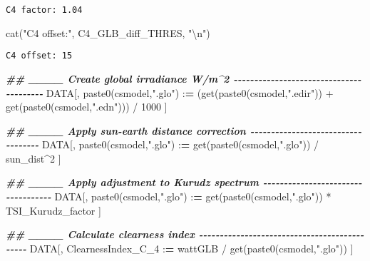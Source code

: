 \documentclass[
  10pt,
  a4paper,oneside]{article}
\newenvironment{Shaded}{\begin{snugshade}}{\end{snugshade}}
\newcommand{\DecValTok}[1]{\textcolor[rgb]{0.00,0.00,0.81}{#1}}
\newcommand{\DocumentationTok}[1]{\textcolor[rgb]{0.56,0.35,0.01}{\textbf{\textit{#1}}}}
\newcommand{\ErrorTok}[1]{\textcolor[rgb]{0.64,0.00,0.00}{\textbf{#1}}}
\newcommand{\FunctionTok}[1]{\textcolor[rgb]{0.00,0.00,0.00}{#1}}
\newcommand{\NormalTok}[1]{#1}
\newcommand{\SpecialCharTok}[1]{\textcolor[rgb]{0.00,0.00,0.00}{#1}}
\newcommand{\StringTok}[1]{\textcolor[rgb]{0.31,0.60,0.02}{#1}}
\begin{document}
\begin{verbatim}
C4 factor: 1.04 
\end{verbatim}

\begin{Shaded}
\begin{Highlighting}[]
\FunctionTok{cat}\NormalTok{(}\StringTok{"C4 offset:"}\NormalTok{, C4\_GLB\_diff\_THRES, }\StringTok{"}\SpecialCharTok{\textbackslash{}n}\StringTok{"}\NormalTok{)}
\end{Highlighting}
\end{Shaded}

\begin{verbatim}
C4 offset: 15 
\end{verbatim}

\begin{Shaded}
\begin{Highlighting}[]
\DocumentationTok{\#\# \_\_\_\_ Create global irradiance W/m\^{}2  {-}{-}{-}{-}{-}{-}{-}{-}{-}{-}{-}{-}{-}{-}{-}{-}{-}{-}{-}{-}{-}{-}{-}{-}{-}{-}{-}{-}{-}{-}{-}{-}{-}{-}{-}{-}{-}{-}{-}{-}}
\NormalTok{DATA[, }\FunctionTok{paste0}\NormalTok{(csmodel,}\StringTok{".glo"}\NormalTok{) }\SpecialCharTok{:}\ErrorTok{=}\NormalTok{ (}\FunctionTok{get}\NormalTok{(}\FunctionTok{paste0}\NormalTok{(csmodel,}\StringTok{".edir"}\NormalTok{)) }\SpecialCharTok{+} \FunctionTok{get}\NormalTok{(}\FunctionTok{paste0}\NormalTok{(csmodel,}\StringTok{".edn"}\NormalTok{))) }\SpecialCharTok{/} \DecValTok{1000}\NormalTok{ ]}


\DocumentationTok{\#\# \_\_\_\_ Apply sun{-}earth distance correction  {-}{-}{-}{-}{-}{-}{-}{-}{-}{-}{-}{-}{-}{-}{-}{-}{-}{-}{-}{-}{-}{-}{-}{-}{-}{-}{-}{-}{-}{-}{-}{-}{-}{-}{-}}
\NormalTok{DATA[, }\FunctionTok{paste0}\NormalTok{(csmodel,}\StringTok{".glo"}\NormalTok{) }\SpecialCharTok{:}\ErrorTok{=} \FunctionTok{get}\NormalTok{(}\FunctionTok{paste0}\NormalTok{(csmodel,}\StringTok{".glo"}\NormalTok{)) }\SpecialCharTok{/}\NormalTok{ sun\_dist}\SpecialCharTok{\^{}}\DecValTok{2}\NormalTok{ ]}


\DocumentationTok{\#\# \_\_\_\_ Apply adjustment to Kurudz spectrum  {-}{-}{-}{-}{-}{-}{-}{-}{-}{-}{-}{-}{-}{-}{-}{-}{-}{-}{-}{-}{-}{-}{-}{-}{-}{-}{-}{-}{-}{-}{-}{-}{-}{-}{-}}
\NormalTok{DATA[, }\FunctionTok{paste0}\NormalTok{(csmodel,}\StringTok{".glo"}\NormalTok{) }\SpecialCharTok{:}\ErrorTok{=} \FunctionTok{get}\NormalTok{(}\FunctionTok{paste0}\NormalTok{(csmodel,}\StringTok{".glo"}\NormalTok{)) }\SpecialCharTok{*}\NormalTok{ TSI\_Kurudz\_factor ]}


\DocumentationTok{\#\# \_\_\_\_ Calculate clearness index  {-}{-}{-}{-}{-}{-}{-}{-}{-}{-}{-}{-}{-}{-}{-}{-}{-}{-}{-}{-}{-}{-}{-}{-}{-}{-}{-}{-}{-}{-}{-}{-}{-}{-}{-}{-}{-}{-}{-}{-}{-}{-}{-}{-}{-}}
\NormalTok{DATA[, ClearnessIndex\_C\_4 }\SpecialCharTok{:}\ErrorTok{=}\NormalTok{ wattGLB }\SpecialCharTok{/} \FunctionTok{get}\NormalTok{(}\FunctionTok{paste0}\NormalTok{(csmodel,}\StringTok{".glo"}\NormalTok{)) ]}


\end{Highlighting}
\end{Shaded}
\end{document}
